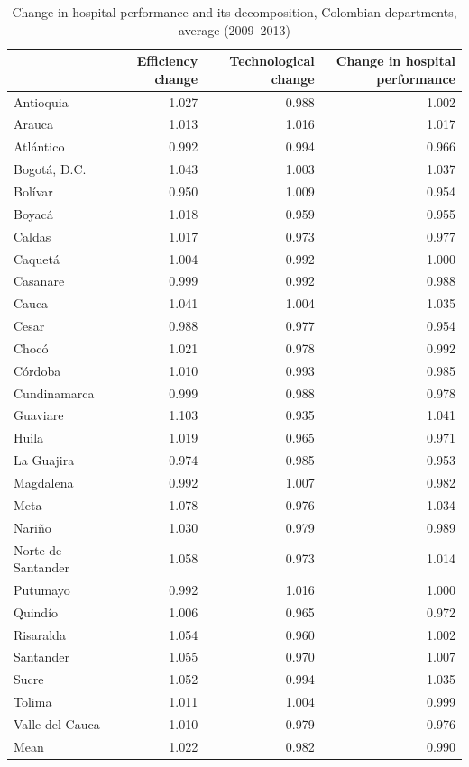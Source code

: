 \documentclass[11pt,a4paper,oneside]{article}
\begin{document}
\begin{table}[htbp]
  \centering
  \caption{Change in hospital performance and its decomposition, Colombian departments, average (2009--2013)}
    \begin{tabular}{lrrr}
    \toprule
          & \parbox[c]{25mm}{\centering Efficiency change} & \parbox[c]{25mm}{\centering Technological change} & \parbox[c]{25mm}{\centering Change in hospital performance} \\
    \midrule
    Antioquia & 1.027 & 0.988 & 1.002 \\
    Arauca & 1.013 & 1.016 & 1.017 \\
    Atl\'antico & 0.992 & 0.994 & 0.966 \\
    Bogot\'a, D.C. & 1.043 & 1.003 & 1.037 \\
    Bol\'ivar & 0.950 & 1.009 & 0.954 \\
    Boyac\'a & 1.018 & 0.959 & 0.955 \\
    Caldas & 1.017 & 0.973 & 0.977 \\
    Caquet\'a & 1.004 & 0.992 & 1.000 \\
    Casanare & 0.999 & 0.992 & 0.988 \\
    Cauca & 1.041 & 1.004 & 1.035 \\
    Cesar & 0.988 & 0.977 & 0.954 \\
    Choc\'o & 1.021 & 0.978 & 0.992 \\
    C\'ordoba & 1.010 & 0.993 & 0.985 \\
    Cundinamarca & 0.999 & 0.988 & 0.978 \\
    Guaviare & 1.103 & 0.935 & 1.041 \\
    Huila & 1.019 & 0.965 & 0.971 \\
    La Guajira & 0.974 & 0.985 & 0.953 \\
    Magdalena & 0.992 & 1.007 & 0.982 \\
    Meta  & 1.078 & 0.976 & 1.034 \\
    Nari\~no & 1.030 & 0.979 & 0.989 \\
    Norte de Santander & 1.058 & 0.973 & 1.014 \\
    Putumayo & 0.992 & 1.016 & 1.000 \\
    Quind\'io & 1.006 & 0.965 & 0.972 \\
    Risaralda & 1.054 & 0.960 & 1.002 \\
    Santander & 1.055 & 0.970 & 1.007 \\
    Sucre & 1.052 & 0.994 & 1.035 \\
    Tolima & 1.011 & 1.004 & 0.999 \\
    Valle del Cauca & 1.010 & 0.979 & 0.976 \\
    \midrule
    Mean  & 1.022 & 0.982 & 0.990 \\
    \bottomrule
    \end{tabular}
  \label{tab:TFP_dpt}
\end{table}
\end{document}
